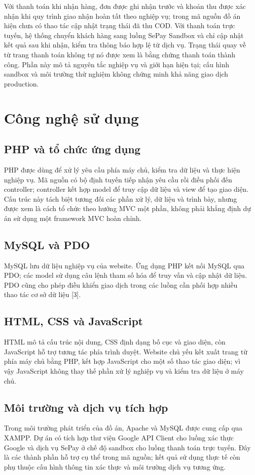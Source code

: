Với thanh toán khi nhận hàng, đơn được ghi nhận trước và khoản thu được xác nhận khi quy trình giao nhận hoàn tất theo nghiệp vụ; trong mã nguồn đồ án hiện chưa có thao tác cập nhật trạng thái đã thu COD. Với thanh toán trực tuyến, hệ thống chuyển khách hàng sang luồng SePay Sandbox và chỉ cập nhật kết quả sau khi nhận, kiểm tra thông báo hợp lệ từ dịch vụ. Trạng thái quay về từ trang thanh toán không tự nó được xem là bằng chứng thanh toán thành công. Phần này mô tả nguyên tắc nghiệp vụ và giới hạn hiện tại; cấu hình sandbox và môi trường thử nghiệm không chứng minh khả năng giao dịch production.

\section{Công nghệ sử dụng}
\subsection{PHP và tổ chức ứng dụng}
PHP được dùng để xử lý yêu cầu phía máy chủ, kiểm tra dữ liệu và thực hiện nghiệp vụ. Mã nguồn có bộ định tuyến tiếp nhận yêu cầu rồi điều phối đến controller; controller kết hợp model để truy cập dữ liệu và view để tạo giao diện. Cấu trúc này tách biệt tương đối các phần xử lý, dữ liệu và trình bày, nhưng được xem là cách tổ chức theo hướng MVC một phần, không phải khẳng định dự án sử dụng một framework MVC hoàn chỉnh.

\subsection{MySQL và PDO}
MySQL lưu dữ liệu nghiệp vụ của website. Ứng dụng PHP kết nối MySQL qua PDO; các model sử dụng câu lệnh tham số hóa để truy vấn và cập nhật dữ liệu. PDO cũng cho phép điều khiển giao dịch trong các luồng cần phối hợp nhiều thao tác cơ sở dữ liệu [3].

\subsection{HTML, CSS và JavaScript}
HTML mô tả cấu trúc nội dung, CSS định dạng bố cục và giao diện, còn JavaScript hỗ trợ tương tác phía trình duyệt. Website chủ yếu kết xuất trang từ phía máy chủ bằng PHP, kết hợp JavaScript cho một số thao tác giao diện; vì vậy JavaScript không thay thế phần xử lý nghiệp vụ và kiểm tra dữ liệu ở máy chủ.

\subsection{Môi trường và dịch vụ tích hợp}
Trong môi trường phát triển của đồ án, Apache và MySQL được cung cấp qua XAMPP. Dự án có tích hợp thư viện Google API Client cho luồng xác thực Google và dịch vụ SePay ở chế độ sandbox cho luồng thanh toán trực tuyến. Đây là các thành phần hỗ trợ cụ thể trong mã nguồn; kết quả sử dụng thực tế còn phụ thuộc cấu hình thông tin xác thực và môi trường dịch vụ tương ứng.


